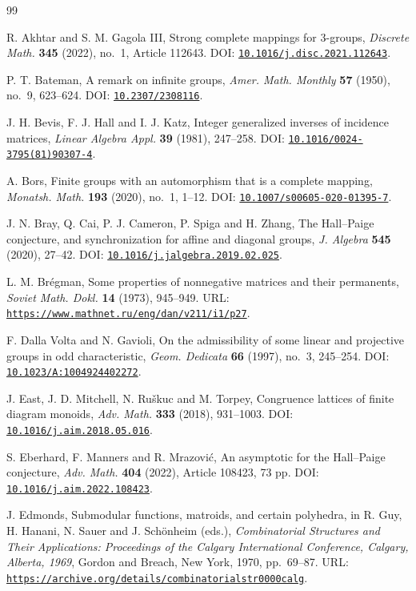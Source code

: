 \documentclass[11pt]{article}
\newcommand{\doilink}[1]{\href{https://doi.org/#1}{\nolinkurl{#1}}}
\newcommand{\weblink}[1]{\href{#1}{\nolinkurl{#1}}}
\theoremstyle{plain}
\theoremstyle{remark}
\theoremstyle{definition}
\theoremstyle{plain}
\begin{document}
\begin{thebibliography}{99}

R. Akhtar and S. M. Gagola III,
Strong complete mappings for $3$-groups,
\textit{Discrete Math.} \textbf{345} (2022), no.~1, Article 112643.
DOI: \doilink{10.1016/j.disc.2021.112643}.

P. T. Bateman,
A remark on infinite groups,
\textit{Amer. Math. Monthly} \textbf{57} (1950), no.~9, 623--624.
DOI: \doilink{10.2307/2308116}.

J. H. Bevis, F. J. Hall and I. J. Katz,
Integer generalized inverses of incidence matrices,
\textit{Linear Algebra Appl.} \textbf{39} (1981), 247--258.
DOI: \doilink{10.1016/0024-3795(81)90307-4}.

A. Bors,
Finite groups with an automorphism that is a complete mapping,
\textit{Monatsh. Math.} \textbf{193} (2020), no.~1, 1--12.
DOI: \doilink{10.1007/s00605-020-01395-7}.

J. N. Bray, Q. Cai, P. J. Cameron, P. Spiga and H. Zhang,
The Hall--Paige conjecture, and synchronization for affine and diagonal groups,
\textit{J. Algebra} \textbf{545} (2020), 27--42.
DOI: \doilink{10.1016/j.jalgebra.2019.02.025}.

L. M. Br\'egman,
Some properties of nonnegative matrices and their permanents,
\textit{Soviet Math. Dokl.} \textbf{14} (1973), 945--949.
URL: \weblink{https://www.mathnet.ru/eng/dan/v211/i1/p27}.

F. Dalla Volta and N. Gavioli,
On the admissibility of some linear and projective groups in odd characteristic,
\textit{Geom. Dedicata} \textbf{66} (1997), no.~3, 245--254.
DOI: \doilink{10.1023/A:1004924402272}.

J. East, J. D. Mitchell, N. Ru\v{s}kuc and M. Torpey,
Congruence lattices of finite diagram monoids,
\textit{Adv. Math.} \textbf{333} (2018), 931--1003.
DOI: \doilink{10.1016/j.aim.2018.05.016}.

S. Eberhard, F. Manners and R. Mrazovi\'c,
An asymptotic for the Hall--Paige conjecture,
\textit{Adv. Math.} \textbf{404} (2022), Article 108423, 73 pp.
DOI: \doilink{10.1016/j.aim.2022.108423}.

J. Edmonds,
Submodular functions, matroids, and certain polyhedra,
in R. Guy, H. Hanani, N. Sauer and J. Sch\"onheim (eds.),
\emph{Combinatorial Structures and Their Applications: Proceedings of the Calgary International Conference, Calgary, Alberta, 1969},
Gordon and Breach, New York, 1970, pp.~69--87.
URL: \weblink{https://archive.org/details/combinatorialstr0000calg}.


\end{thebibliography}
\end{document}
